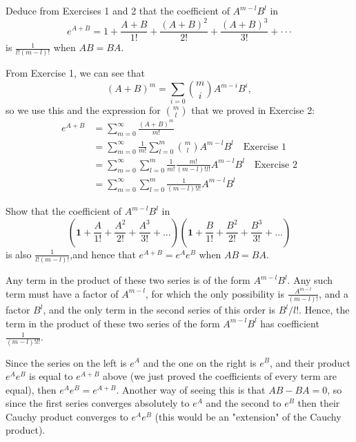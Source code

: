 \documentclass[11pt,onecolumn]{article}
\begin{document}
\begin{exercise}
Deduce from Exercises 1 and 2 that the coefficient of $A^{m-l}B^l$ in $$e^{A+B} = 1+ \frac{A+B}{1!} + \frac{(A+B)^2}{2!} + \frac{(A+B)^3}{3!} +···$$ is $\frac{1}{l!(m-l)!}$ when $AB=BA$.
\end{exercise}
\begin{answer}
From Exercise 1, we can see that 
$$ (A+B)^m = \sum_{i=0} \binom{m}{i} A^{m-i}B^i, $$ so we use this and the expression for $\binom{m}{l}$ that we proved in Exercise 2:
\begin{align*}
    e^{A+B} &= \sum_{m=0}^\infty \frac{(A+B)^m}{m!} \\
    &= \sum_{m=0}^\infty \frac{1}{m!}\sum_{l=0}^m \binom{m}{l} A^{m-l}B^l \quad \text{Exercise 1} \\
    &= \sum_{m=0}^\infty \sum_{l=0}^m \frac{1}{m!} \frac{m!}{(m-l)!l!} A^{m-l}B^l \quad \text{Exercise 2}\\
    &= \sum_{m=0}^\infty \sum_{l=0}^m \frac{1}{(m-l)!l!} A^{m-l}B^l
\end{align*}
\end{answer}
\begin{exercise}
Show that the coefficient of $A^{m-l}B^l$ in 
$$( \mathbf{1} + \frac{A}{1!} + \frac{A^2}{2!} + \frac{A^3}{3!}+...  ) ( \mathbf{1} + \frac{B}{1!} + \frac{B^2}{2!} + \frac{B^3}{3!}+... ) $$
is also $\frac{1}{l!(m−l)!}$,and hence that $e^{A+B} =e^Ae^B$ when $AB=BA$.
\end{exercise}
\begin{answer}
Any term in the product of these two series is of the form $A^{m-l}B^l$. Any such term must have a factor of $A^{m-l}$, for which the only possibility is $\frac{A^{m-l}}{(m-l)!}$, and a factor $B^l$, and the only term in the second series of this order is $B^l/l!$. Hence, the term in the product of these two series of the form $A^{m-l}B^l$ has coefficient $\frac{1}{(m-l)!l!}$.

Since the series on the left is $e^A$ and the one on the right is $e^B$, and their product $e^Ae^B$ is equal to $e^{A+B}$ above (we just proved the coefficients of every term are equal), then $e^Ae^B=e^{A+B}$. Another way of seeing this is that $AB - BA = 0$, so since the first series converges absolutely to $e^A$ and the second to $e^B$ then their Cauchy product converges to $e^Ae^B$ (this would be an "extension" of the Cauchy product).
\end{answer}
\end{document}
